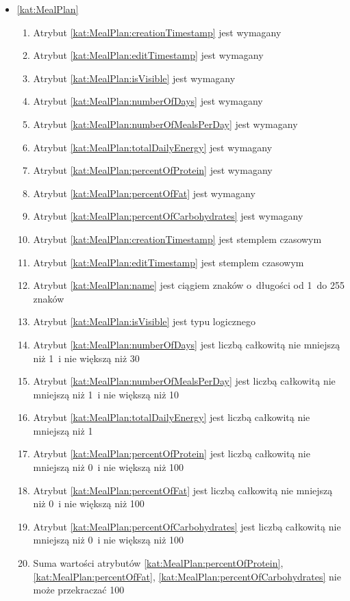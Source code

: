 \begin{itemize}[label={\textbf{Ograniczenia dla}}, wide, labelwidth=!, labelindent=0pt]
    \setlength\itemsep{1.75em}
    \item\ref{kat:MealPlan}\mynobreakpar
    \begin{enumerate}[label={\textbf{OGR/4/\protect\twodigits{\arabic{enumi}}}}, wide, labelwidth=!, align=left, leftmargin=3cm]
        \item Atrybut \ref{kat:MealPlan:creationTimestamp} jest wymagany
        \item Atrybut \ref{kat:MealPlan:editTimestamp} jest wymagany
        \item Atrybut \ref{kat:MealPlan:isVisible} jest wymagany
        \item Atrybut \ref{kat:MealPlan:numberOfDays}  jest wymagany
        \item Atrybut \ref{kat:MealPlan:numberOfMealsPerDay} jest wymagany
        \item Atrybut \ref{kat:MealPlan:totalDailyEnergy} jest wymagany
        \item Atrybut \ref{kat:MealPlan:percentOfProtein} jest wymagany
        \item Atrybut \ref{kat:MealPlan:percentOfFat} jest wymagany
        \item Atrybut \ref{kat:MealPlan:percentOfCarbohydrates} jest wymagany

        \item Atrybut \ref{kat:MealPlan:creationTimestamp} jest stemplem czasowym
        \item Atrybut \ref{kat:MealPlan:editTimestamp} jest stemplem czasowym
        \item Atrybut \ref{kat:MealPlan:name} jest ciągiem znaków o~długości od 1~do 255 znaków
        \item Atrybut \ref{kat:MealPlan:isVisible} jest typu logicznego
        \item Atrybut \ref{kat:MealPlan:numberOfDays} jest liczbą całkowitą nie mniejszą niż 1~i nie większą niż 30
        \item Atrybut \ref{kat:MealPlan:numberOfMealsPerDay} jest liczbą całkowitą nie mniejszą niż 1~i nie większą niż 10
        \item Atrybut \ref{kat:MealPlan:totalDailyEnergy} jest liczbą całkowitą nie mniejszą niż 1
        \item Atrybut \ref{kat:MealPlan:percentOfProtein} jest liczbą całkowitą nie mniejszą niż 0~i nie większą niż 100
        \item Atrybut \ref{kat:MealPlan:percentOfFat} jest liczbą całkowitą nie mniejszą niż 0~i nie większą niż 100
        \item Atrybut \ref{kat:MealPlan:percentOfCarbohydrates} jest liczbą całkowitą nie mniejszą niż 0~i nie większą niż 100
        \item Suma wartości atrybutów \ref{kat:MealPlan:percentOfProtein}, \ref{kat:MealPlan:percentOfFat}, \ref{kat:MealPlan:percentOfCarbohydrates} nie może przekraczać 100
    \end{enumerate}


\end{itemize}
